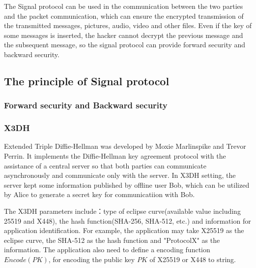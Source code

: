 \documentclass[11pt,en]{elegantpaper}
\begin{document}
The Signal protocol can be used in the communication between the two parties and the packet communication, which can ensure the encrypted transmission of the transmitted messages, pictures, audio, video and other files. Even if the key of some messages is inserted, the hacker cannot decrypt the previous message and the subsequent message, so the signal protocol can provide forward security and backward security.

\subsection{The principle of Signal protocol}

\subsubsection{Forward security and Backward security}


\subsubsection{X3DH}
Extended Triple Diffie-Hellman was developed by Moxie Marlinspike and Trevor Perrin. It implements the Diffie-Hellman key agreement protocol with the assistance of a central server so that both parties can communicate asynchronously and communicate only with the server. In X3DH setting, the server kept some information published by offline user Bob, which can be utilized by Alice to generate a secret key for communicatiion with Bob.

The X3DH parameters include：type of eclipse curve(available value including 25519 and X448), the hash function(SHA-256, SHA-512, etc.) and information for application identification. For example, the application may take X25519 as the eclipse curve, the SHA-512 as the hash function and "ProtocolX" as the information. The application also need to define a encoding function $Encode(PK)$, for encoding the public key $PK$ of X25519 or X448 to string.
\end{document}

